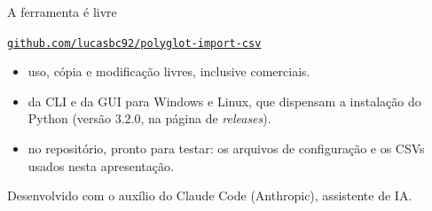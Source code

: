 \begin{frame}[label=livre]{A ferramenta é livre}
  \begin{minipage}[c]{0.62\textwidth}
    \par
    \smallskip
    {\href{https://github.com/lucasbc92/polyglot-import-csv}%
      {\texttt{github.com/lucasbc92/polyglot-import-csv}}\par}
    \bigskip
    \footnotesize
    \setlength{\leftmargini}{1.1em}
    \begin{itemize}
      \setlength{\itemsep}{3pt}
      \item {} uso, cópia e modificação livres, inclusive comerciais.
      \item {} da CLI e da GUI para Windows e Linux, que dispensam a
            instalação do Python (versão 3.2.0, na página de \textit{releases}).
      \item {} no repositório, pronto para testar: os
            arquivos de configuração e os CSVs usados nesta apresentação.
    \end{itemize}
  \end{minipage}\hfill
  \begin{minipage}[c]{0.32\textwidth}
    \centering
    \par
  \end{minipage}
  \vfill
  {\scriptsize\color{black!60}Desenvolvido com o auxílio do Claude Code (Anthropic),
   assistente de IA.\par}
\end{frame}
